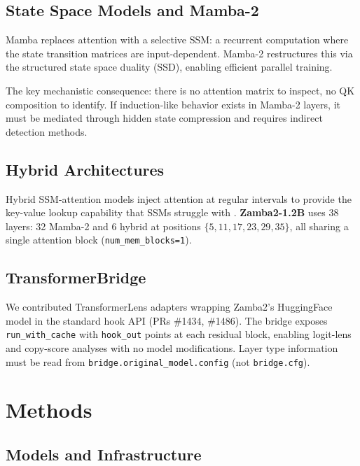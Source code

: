 \documentclass[11pt,a4paper]{article}
\begin{document}
\subsection{State Space Models and Mamba-2}

Mamba \citep{gu2023mamba} replaces attention with a selective SSM: a recurrent computation where the state transition matrices are input-dependent. Mamba-2 \citep{dao2024transformers} restructures this via the structured state space duality (SSD), enabling efficient parallel training.

The key mechanistic consequence: there is no attention matrix to inspect, no QK composition to identify. If induction-like behavior exists in Mamba-2 layers, it must be mediated through hidden state compression and requires indirect detection methods.

\subsection{Hybrid Architectures}

Hybrid SSM-attention models inject attention at regular intervals to provide the key-value lookup capability that SSMs struggle with \citep{jelassi2024repeat}. \textbf{Zamba2-1.2B} \citep{zyphra2024zamba2} uses 38 layers: 32 Mamba-2 and 6 hybrid at positions $\{5, 11, 17, 23, 29, 35\}$, all sharing a single attention block (\texttt{num\_mem\_blocks=1}).

\subsection{TransformerBridge}

We contributed TransformerLens adapters wrapping Zamba2's HuggingFace model in the standard hook API (PRs \#1434, \#1486). The bridge exposes \texttt{run\_with\_cache} with \texttt{hook\_out} points at each residual block, enabling logit-lens and copy-score analyses with no model modifications. Layer type information must be read from \texttt{bridge.original\_model.config} (not \texttt{bridge.cfg}).

\section{Methods}

\subsection{Models and Infrastructure}
\end{document}
